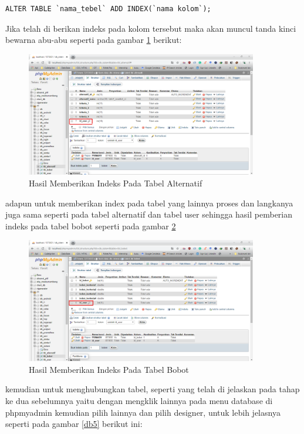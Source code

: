 \begin{verbatim}
ALTER TABLE `nama_tebel` ADD INDEX(`nama kolom`);
\end{verbatim}

Jika telah di berikan indeks pada kolom tersebut maka akan muncul tanda kinci bewarna abu-abu seperti pada gambar \ref{db3} berikut:

\begin{figure}[!htbp]
	\centerline{\includegraphics[width=0.90\textwidth]{figures/db/3.png}}
	\caption{Hasil Memberikan Indeks Pada Tabel Alternatif}
	\label{db3}
\end{figure}
\pagebreak

adapun untuk memberikan index pada tabel yang lainnya proses dan langkanya juga sama seperti pada tabel alternatif dan tabel user sehingga hasil pemberian indeks pada tabel bobot seperti pada gambar \ref{db4}


\begin{figure}[!htbp]
	\centerline{\includegraphics[width=0.90\textwidth]{figures/db/4.png}}
	\caption{Hasil Memberikan Indeks Pada Tabel Bobot}
	\label{db4}
\end{figure}

kemudian untuk menghubungkan tabel, seperti yang telah di jelaskan pada tahap ke dua sebelumnya yaitu dengan mengklik lainnya pada menu database di phpmyadmin kemudian pilih lainnya dan pilih designer, untuk lebih jelasnya seperti pada gambar \ref{db5} berikut ini:

